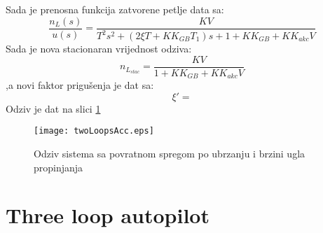 Sada je prenosna funkcija zatvorene petlje data sa:
\begin{equation}
    \frac{n_L(s)}{u(s)} = \frac{KV}{T^2s^2 + (2\xi T+KK_{GB}T_1)s + 1+KK_{GB}+KK_{akc}V}
\end{equation}
Sada je nova stacionaran vrijednost odziva:
\begin{equation*}
    n_{L_{stac}} = \frac{KV}{ 1+KK_{GB}+KK_{akc}V}
\end{equation*}
,a novi faktor prigušenja je dat sa:
\begin{equation*}
    \xi ' = 
\end{equation*}
Odziv je dat na slici \ref{fig:acc2loopsres}
\begin{figure}[!ht]
    \centering
    \texttt{[image: twoLoopsAcc.eps]}
    \caption{Odziv sistema sa povratnom spregom po ubrzanju i brzini ugla propinjanja}
    \label{fig:acc2loopsres}
\end{figure}
\section{Three loop autopilot}